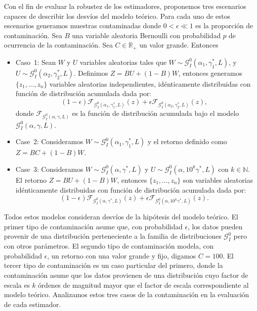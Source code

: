 Con el fin de evaluar la robustez de los estimadores, proponemos tres escenarios capaces de describir los desvíos del modelo teórico. Para cada uno de estos escenarios generamos muestras contaminadas donde $0<\epsilon \ll 1$ es la proporción de contaminación. 
Sea  $B$ una variable aleatoria Bernoulli con probabilidad $p$ de ocurrencia de la contaminación. Sea $C \in \mathbb R_+$ un valor grande. Entonces
\begin{itemize}
	\item Caso~1:
	Sean $W$ y $U$ variables aleatorias tales que $W \sim \mathcal{G}_I^0(\alpha_1,\gamma_1^*,L)$, y $U \sim \mathcal{G}_I^0(\alpha_2,\gamma_2^*,L) $. Definimos $Z=BU+(1-B)W$, entonces generamos $\{z_1,\dots,z_n\}$ variables aleatorias independientes, idénticamente distribuidas con función de distribución acumulada dada por:
	$$
	(1-\epsilon) \mathcal{F}_{\mathcal{G}_I^0(\alpha_1,\gamma_1^*,L)}(z)+\epsilon\mathcal{F}_{\mathcal{G}_I^0(\alpha_2,\gamma_2^*,L)}(z),
	$$
	donde $\mathcal{F}_{\mathcal{G}_I^0(\alpha,\gamma,L)}$ es la función de distribución acumulada bajo el modelo $\mathcal{G}_I^0(\alpha,\gamma,L)$.
	\item Case~2: Consideramos $W \sim \mathcal{G}_I^0(\alpha_1,\gamma_1^*,L)$ y el retorno definido como $Z=BC+(1-B)W$.
	\item Case~3:
	Consideramos $W \sim \mathcal{G}_I^0(\alpha,\gamma^*,L)$ y $U\sim \mathcal{G}_I^0(\alpha,10^k\gamma^*,L) $ con $k \in \mathbb{N}$. 
	El retorno $Z=BU+(1-B)W$, entonces $\{z_1,\dots,z_n\}$ son variables aleatorias idénticamente distribuidas con función de distribución acumulada dada por: 
	$$
	(1-\epsilon) \mathcal{F}_{\mathcal{G}_I^0(\alpha,\gamma^*,L)}(z)+\epsilon\mathcal{F}_{\mathcal{G}_I^0(\alpha,10^k\gamma^*,L)}(z).
	$$
\end{itemize}

Todos estos modelos consideran desvíos de la hipótesis del modelo teórico. El primer tipo de contaminación asume que, con probabilidad $\epsilon$, los datos pueden provenir de una distribución perteneciente a la familia de distribuciones $\mathcal{G}_I^0$ pero con otros parámetros. El segundo tipo de contaminación modela, con probabilidad $\epsilon$, un retorno con una valor grande y fijo, digamos $C=100$. El tercer tipo de contaminación es un caso particular del primero, donde la contaminación asume que los datos provienen de una distribución cuyo factor de escala es $k$ órdenes de magnitud mayor que el factor de escala correspondiente al modelo teórico. Analizamos estos tres casos de la contaminación en la evaluación de cada estimador.

